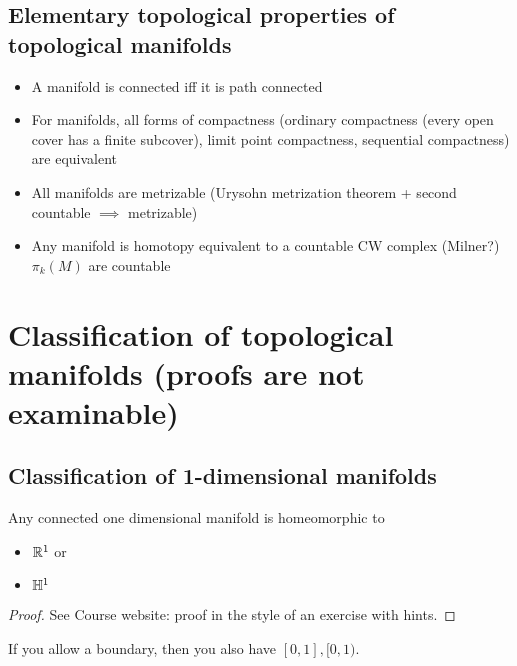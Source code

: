 \subsection{Elementary topological properties of topological manifolds}


\begin{itemize}
    \item A manifold is connected iff it is path connected 
    \item For manifolds, all forms of compactness (ordinary compactness (every open cover has a finite subcover), limit point compactness, sequential compactness) are equivalent
    \item All manifolds are metrizable (Urysohn metrization theorem + second countable \(\implies\) metrizable) 
    \item Any manifold is homotopy equivalent to a countable CW complex (Milner?) \(\pi_k(M)\) are countable
\end{itemize}

\section{Classification of topological manifolds (proofs are not examinable)}
\subsection{Classification of 1-dimensional manifolds}
\begin{theorem}\label{thm:1.9}
    Any connected one dimensional manifold is homeomorphic to  
    \begin{itemize}
        \item \(\mathbb{R}^1\) or
        \item \(\mathbb{H}^1\)
    \end{itemize}
\end{theorem}

\begin{proof}
    See Course website: proof in the style of an exercise with hints. 
\end{proof}

\begin{remark}
    If you allow a boundary, then you also have \([0,1],[0,1)\). 
\end{remark}

